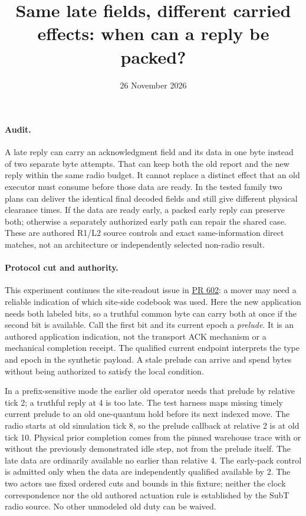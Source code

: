 \documentclass[11pt]{article}
\begin{document}
\title{Same late fields, different carried effects: when can a reply be packed?}
\author{}
\date{26 November 2026}
\maketitle

\paragraph{Audit.}
A late reply can carry an acknowledgment field and its data in
one byte instead of two separate byte attempts. That can keep
both the old report and the new reply within the same radio
budget. It cannot replace a distinct effect that an old executor
must consume before those data are ready. In the tested family two
plans can deliver the identical final decoded fields and still
give different physical clearance times. If the data are ready
early, a packed early reply can preserve both; otherwise a
separately authorized early path can repair the shared case.
These are authored R1/L2 source controls and exact same-information
direct matches, not an architecture or independently selected
non-radio result.

\paragraph{Protocol cut and authority.}
This experiment continues the site-readout issue in
\href{https://github.com/eternal-november/eos-research-programmes/pull/602}{PR 602}:
a mover may need a reliable indication of which site-side codebook
was used. Here the new application needs both labeled bits, so a
truthful common byte can carry both at once if the second bit is
available. Call the first bit and its current epoch a \emph{prelude}.
It is an authored application indication, not the transport
ACK mechanism or a mechanical completion receipt. The qualified
current endpoint interprets the type and epoch in the synthetic
payload. A stale prelude can arrive and spend bytes without being
authorized to satisfy the local condition.

In a prefix-sensitive mode the earlier old operator needs that
prelude by relative tick 2; a truthful reply at 4 is too late.
The test harness maps missing timely current prelude to an old
one-quantum hold before its next indexed move. The radio starts
at old simulation tick 8, so the prelude callback at relative 2
is at old tick 10. Physical prior completion comes from the
pinned warehouse trace with or without the previously demonstrated
idle step, not from the prelude itself. The late data are
ordinarily available no earlier than relative 4. The early-pack
control is admitted only when the data are independently
qualified available by 2. The two actors use fixed ordered
cuts and bounds in this fixture; neither the clock correspondence
nor the old authored actuation rule is established by the
SubT radio source. No other unmodeled old duty can be waived.
\end{document}
